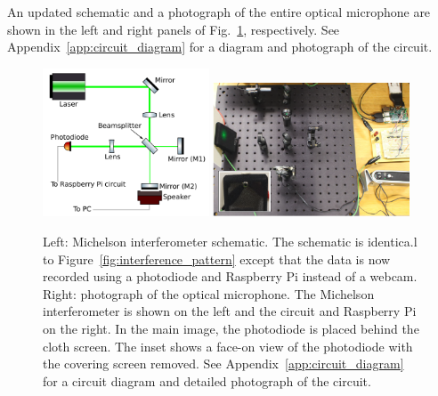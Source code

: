 \documentclass[paper-main.tex]{subfiles}
\begin{document}
An updated schematic and a photograph of the entire optical microphone are shown in the left and right panels of Fig.~\ref{fig:ifo_schematic_podo}, respectively.
See Appendix~\ref{app:circuit_diagram} for a diagram and photograph of the circuit. 


\begin{figure}
	\includegraphics[width=0.44\textwidth]{figures/ifo_schematic_photodiode_edit.pdf}
	\includegraphics[width=0.52\textwidth]{figures/setup_pic2.pdf}
	\caption{
Left: Michelson interferometer schematic. 
The schematic is identica.l to Figure~\ref{fig:interference_pattern} except that the data is now recorded using a photodiode and Raspberry Pi instead of a webcam. 
Right: photograph of the optical microphone. 
The Michelson interferometer is shown on the left and the circuit and Raspberry Pi on the right. 
In the main image, the photodiode is placed behind the cloth screen. 
The inset shows a face-on view of the photodiode with the covering screen removed. 
See Appendix~\ref{app:circuit_diagram} for a circuit diagram and detailed photograph of the circuit.
}
	\label{fig:ifo_schematic_podo}
\end{figure}
\end{document}
